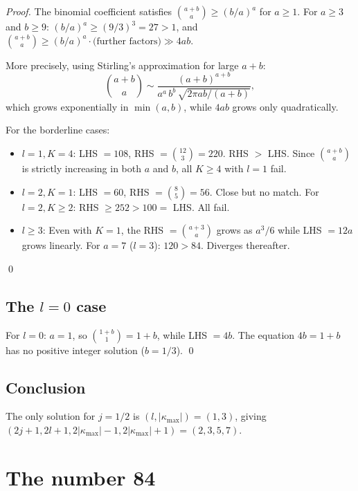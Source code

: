 \documentclass[11pt,letterpaper]{article}
\numberwithin{equation}{section}
\begin{document}
\textit{Proof.}
The binomial coefficient satisfies $\binom{a+b}{a} \geq (b/a)^a$ for $a \geq 1$.
For $a \geq 3$ and $b \geq 9$: $(b/a)^a \geq (9/3)^3 = 27 > 1$, and
$\binom{a+b}{a} \geq (b/a)^a \cdot \text{(further factors)} \gg 4ab$.

More precisely, using Stirling's approximation for large $a+b$:
\begin{equation}
  \binom{a+b}{a} \sim \frac{(a+b)^{a+b}}{a^a\,b^b\,\sqrt{2\pi ab/(a+b)}},
\end{equation}
which grows exponentially in $\min(a,b)$, while $4ab$ grows only quadratically.

For the borderline cases:
\begin{itemize}
  \item $l = 1, K = 4$: LHS $= 108$, RHS $= \binom{12}{3} = 220$. RHS $>$ LHS. Since
    $\binom{a+b}{a}$ is strictly increasing in both $a$ and $b$, all $K \geq 4$ with $l = 1$ fail.
  \item $l = 2, K = 1$: LHS $= 60$, RHS $= \binom{8}{5} = 56$. Close but no match.
    For $l = 2, K \geq 2$: RHS $\geq 252 > 100 =$ LHS. All fail.
  \item $l \geq 3$: Even with $K = 1$, the RHS $= \binom{a+3}{a}$ grows as $a^3/6$
    while LHS $= 12a$ grows linearly. For $a = 7$ ($l = 3$): $120 > 84$. Diverges thereafter.
\end{itemize}
\qed

\subsection{The $l = 0$ case}

For $l = 0$: $a = 1$, so $\binom{1+b}{1} = 1+b$, while LHS $= 4b$.
The equation $4b = 1+b$ has no positive integer solution ($b = 1/3$). \qed

\subsection{Conclusion}

The only solution for $j = 1/2$ is $(l, |\kappa_\mathrm{max}|) = (1, 3)$,
giving $(2j+1, 2l+1, 2|\kappa_\mathrm{max}|-1, 2|\kappa_\mathrm{max}|+1) = (2, 3, 5, 7)$.

\section{The number 84}
\label{sec:84}
\end{document}

